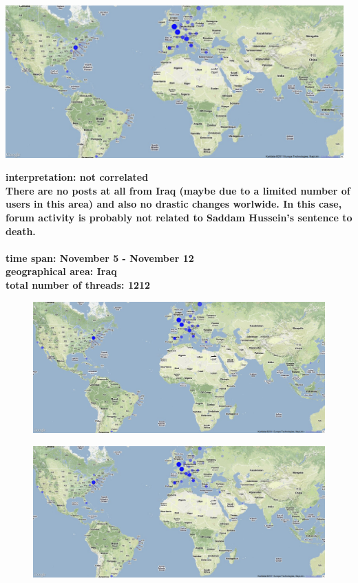 \documentclass[11pt,a4paper,english]{article}
\begin{document}
\begin{itemize}
					\includegraphics[width=130mm]{img/post-saddam}
						
					\bf interpretation: \rm not correlated
					\\ There are no posts at all from Iraq (maybe due to a limited number of users in this area) and also no drastic changes worlwide. In this case, forum activity is probably not related to Saddam Hussein's sentence to death.
						\\\\ \bf time span: \rm November 5 - November 12
						\\ \bf geographical area: \rm Iraq
						\\ \bf total number of threads: \rm 1212
						\begin{figure}[H]
							\vspace{-13pt}
  							\begin{center}
								\includegraphics[width=130mm]{img/pre-saddam}
							\end{center}
							\vspace{-13pt}
						\end{figure}
						\begin{figure}[H]
							\vspace{-13pt}
  							\begin{center}
								\includegraphics[width=130mm]{img/post-saddam}

\end{center}
\end{figure}
\end{itemize}
\end{document}
